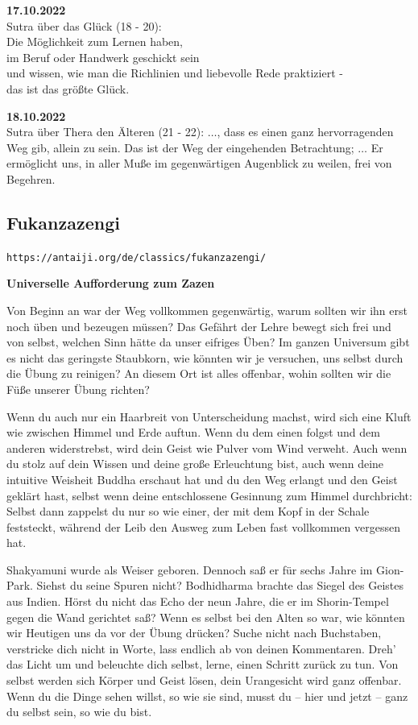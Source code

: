 \documentclass[10pt,a4paper]{article}
\begin{document}
{\bf 17.10.2022} \\
Sutra über das Glück (18 - 20): \\
Die Möglichkeit zum Lernen haben, \\
im Beruf oder Handwerk geschickt sein \\
und wissen, wie man die Richlinien und liebevolle Rede praktiziert - \\
das ist das größte Glück.

\vskip 4pt
{\bf 18.10.2022} \\
Sutra über Thera den Älteren (21 - 22):
$\ldots$, dass es einen ganz hervorragenden Weg gib, allein zu sein. Das ist der
Weg der eingehenden Betrachtung; $\ldots$ Er ermöglicht uns, in aller Muße im
gegenwärtigen Augenblick zu weilen, frei von Begehren.


\newpage
\subsection{Fukanzazengi}

\verb+https://antaiji.org/de/classics/fukanzazengi/+

\vskip 4pt
{\bf Universelle Aufforderung zum Zazen}

\vskip 4pt
Von Beginn an war der Weg vollkommen gegenwärtig, warum sollten wir ihn erst noch üben und bezeugen
müssen? Das Gefährt der Lehre bewegt sich frei und von selbst, welchen Sinn hätte da unser eifriges Üben? Im
ganzen Universum gibt es nicht das geringste Staubkorn, wie könnten wir je versuchen, uns selbst durch die
Übung zu reinigen? An diesem Ort ist alles offenbar, wohin sollten wir die Füße unserer Übung richten?

\vskip 4pt
Wenn du auch nur ein Haarbreit von Unterscheidung machst, wird sich eine Kluft wie zwischen Himmel und Erde
auftun. Wenn du dem einen folgst und dem anderen widerstrebst, wird dein Geist wie Pulver vom Wind verweht.
Auch wenn du stolz auf dein Wissen und deine große Erleuchtung bist, auch wenn deine intuitive Weisheit Buddha
erschaut hat und du den Weg erlangt und den Geist geklärt hast, selbst wenn deine entschlossene Gesinnung zum
Himmel durchbricht: Selbst dann zappelst du nur so wie einer, der mit dem Kopf in der Schale feststeckt, während
der Leib den Ausweg zum Leben fast vollkommen vergessen hat.

\vskip 4pt
Shakyamuni wurde als Weiser geboren. Dennoch saß er für sechs Jahre im Gion-Park. Siehst du seine Spuren
nicht? Bodhidharma brachte das Siegel des Geistes aus Indien. Hörst du nicht das Echo der neun Jahre, die er im
Shorin-Tempel gegen die Wand gerichtet saß? Wenn es selbst bei den Alten so war, wie könnten wir Heutigen uns
da vor der Übung drücken? Suche nicht nach Buchstaben, verstricke dich nicht in Worte, lass endlich ab von
deinen Kommentaren. Dreh’ das Licht um und beleuchte dich selbst, lerne, einen Schritt zurück zu tun. Von selbst
werden sich Körper und Geist lösen, dein Urangesicht wird ganz offenbar. Wenn du die Dinge sehen willst, so wie
sie sind, musst du – hier und jetzt – ganz du selbst sein, so wie du bist.
\end{document}
